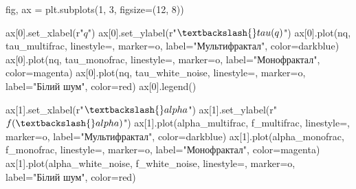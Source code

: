 \documentclass[
  letterpaper,
]{report}
\newenvironment{Shaded}{\begin{snugshade}}{\end{snugshade}}
\newcommand{\DecValTok}[1]{\textcolor[rgb]{0.68,0.00,0.00}{#1}}
\newcommand{\NormalTok}[1]{\textcolor[rgb]{0.00,0.23,0.31}{#1}}
\newcommand{\OperatorTok}[1]{\textcolor[rgb]{0.37,0.37,0.37}{#1}}
\newcommand{\StringTok}[1]{\textcolor[rgb]{0.13,0.47,0.30}{#1}}
\newcommand{\VerbatimStringTok}[1]{\textcolor[rgb]{0.13,0.47,0.30}{#1}}
\begin{document}
\begin{Shaded}
\begin{Highlighting}[]
\NormalTok{fig, ax }\OperatorTok{=}\NormalTok{ plt.subplots(}\DecValTok{1}\NormalTok{, }\DecValTok{3}\NormalTok{, figsize}\OperatorTok{=}\NormalTok{(}\DecValTok{12}\NormalTok{, }\DecValTok{8}\NormalTok{))}

\NormalTok{ax[}\DecValTok{0}\NormalTok{].set\_xlabel(}\VerbatimStringTok{r"$q$"}\NormalTok{)}
\NormalTok{ax[}\DecValTok{0}\NormalTok{].set\_ylabel(}\VerbatimStringTok{r"$\textbackslash{}tau(q)$"}\NormalTok{)}
\NormalTok{ax[}\DecValTok{0}\NormalTok{].plot(nq, tau\_multifrac, linestyle}\OperatorTok{=}\StringTok{\textquotesingle{}{-}\textquotesingle{}}\NormalTok{, marker}\OperatorTok{=}\StringTok{\textquotesingle{}o\textquotesingle{}}\NormalTok{, label}\OperatorTok{=}\StringTok{"Мультифрактал"}\NormalTok{, color}\OperatorTok{=}\StringTok{\textquotesingle{}darkblue\textquotesingle{}}\NormalTok{)}
\NormalTok{ax[}\DecValTok{0}\NormalTok{].plot(nq, tau\_monofrac, linestyle}\OperatorTok{=}\StringTok{\textquotesingle{}{-}\textquotesingle{}}\NormalTok{, marker}\OperatorTok{=}\StringTok{\textquotesingle{}o\textquotesingle{}}\NormalTok{, label}\OperatorTok{=}\StringTok{"Монофрактал"}\NormalTok{, color}\OperatorTok{=}\StringTok{\textquotesingle{}magenta\textquotesingle{}}\NormalTok{)}
\NormalTok{ax[}\DecValTok{0}\NormalTok{].plot(nq, tau\_white\_noise, linestyle}\OperatorTok{=}\StringTok{\textquotesingle{}{-}\textquotesingle{}}\NormalTok{, marker}\OperatorTok{=}\StringTok{\textquotesingle{}o\textquotesingle{}}\NormalTok{, label}\OperatorTok{=}\StringTok{"Білий шум"}\NormalTok{, color}\OperatorTok{=}\StringTok{\textquotesingle{}red\textquotesingle{}}\NormalTok{)}
\NormalTok{ax[}\DecValTok{0}\NormalTok{].legend()}

\NormalTok{ax[}\DecValTok{1}\NormalTok{].set\_xlabel(}\VerbatimStringTok{r"$\textbackslash{}alpha$"}\NormalTok{)}
\NormalTok{ax[}\DecValTok{1}\NormalTok{].set\_ylabel(}\VerbatimStringTok{r"$f(\textbackslash{}alpha)$"}\NormalTok{)}
\NormalTok{ax[}\DecValTok{1}\NormalTok{].plot(alpha\_multifrac, f\_multifrac, linestyle}\OperatorTok{=}\StringTok{\textquotesingle{}{-}\textquotesingle{}}\NormalTok{, marker}\OperatorTok{=}\StringTok{\textquotesingle{}o\textquotesingle{}}\NormalTok{, label}\OperatorTok{=}\StringTok{"Мультифрактал"}\NormalTok{, color}\OperatorTok{=}\StringTok{\textquotesingle{}darkblue\textquotesingle{}}\NormalTok{)}
\NormalTok{ax[}\DecValTok{1}\NormalTok{].plot(alpha\_monofrac, f\_monofrac, linestyle}\OperatorTok{=}\StringTok{\textquotesingle{}{-}\textquotesingle{}}\NormalTok{, marker}\OperatorTok{=}\StringTok{\textquotesingle{}o\textquotesingle{}}\NormalTok{, label}\OperatorTok{=}\StringTok{"Монофрактал"}\NormalTok{, color}\OperatorTok{=}\StringTok{\textquotesingle{}magenta\textquotesingle{}}\NormalTok{)}
\NormalTok{ax[}\DecValTok{1}\NormalTok{].plot(alpha\_white\_noise, f\_white\_noise, linestyle}\OperatorTok{=}\StringTok{\textquotesingle{}{-}\textquotesingle{}}\NormalTok{, marker}\OperatorTok{=}\StringTok{\textquotesingle{}o\textquotesingle{}}\NormalTok{, label}\OperatorTok{=}\StringTok{"Білий шум"}\NormalTok{, color}\OperatorTok{=}\StringTok{\textquotesingle{}red\textquotesingle{}}\NormalTok{)}


\end{Highlighting}
\end{Shaded}
\end{document}
